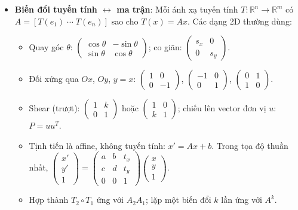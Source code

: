 \begin{itemize}
    \item \textbf{Biến đổi tuyến tính $\leftrightarrow$ ma trận}: Mỗi ánh xạ tuyến tính $T:\mathbb{R}^n\to\mathbb{R}^m$ có $A=[T(e_1)\;\cdots\;T(e_n)]$ sao cho $T(x)=Ax$. Các dạng 2D thường dùng:
    \begin{itemize}
        \item Quay góc $\theta$: $\begin{pmatrix}\cos\theta&-\sin\theta\\\sin\theta&\cos\theta\end{pmatrix}$; co giãn: $\begin{pmatrix}s_x&0\\0&s_y\end{pmatrix}$.
        \item Đối xứng qua $Ox$, $Oy$, $y=x$: $\begin{pmatrix}1&0\\0&-1\end{pmatrix}$, $\begin{pmatrix}-1&0\\0&1\end{pmatrix}$, $\begin{pmatrix}0&1\\1&0\end{pmatrix}$.
        \item Shear (trượt): $\begin{pmatrix}1&k\\0&1\end{pmatrix}$ hoặc $\begin{pmatrix}1&0\\k&1\end{pmatrix}$; chiếu lên vector đơn vị $u$: $P=uu^T$.
        \item Tịnh tiến là affine, không tuyến tính: $x'=Ax+b$. Trong tọa độ thuần nhất, $\begin{pmatrix}x'\\y'\\1\end{pmatrix}=\begin{pmatrix}a&b&t_x\\c&d&t_y\\0&0&1\end{pmatrix}\begin{pmatrix}x\\y\\1\end{pmatrix}$.
        \item Hợp thành $T_2\circ T_1$ ứng với $A_2A_1$; lặp một biến đổi $k$ lần ứng với $A^k$.

\end{itemize}
\end{itemize}
